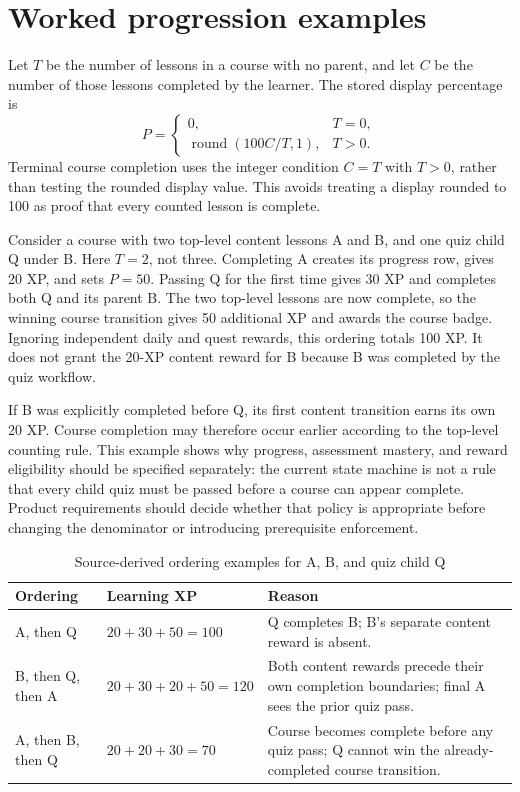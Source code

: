 \documentclass[12pt,a4paper,oneside]{report}
\begin{document}
\section{Worked progression examples}
\label{sec:progression-examples}
Let $T$ be the number of lessons in a course with no parent, and let $C$ be the number
of those lessons completed by the learner. The stored display percentage is
\[
 P = \begin{cases}
  0, & T=0,\\
  \operatorname{round}(100C/T,1), & T>0.
 \end{cases}
\]
Terminal course completion uses the integer condition $C=T$ with $T>0$, rather than
testing the rounded display value. This avoids treating a display rounded to 100 as
proof that every counted lesson is complete.

Consider a course with two top-level content lessons A and B, and one quiz child Q
under B. Here $T=2$, not three. Completing A creates its progress row, gives 20 XP,
and sets $P=50$. Passing Q for the first time gives 30 XP and completes both Q and
its parent B. The two top-level lessons are now complete, so the winning course
transition gives 50 additional XP and awards the course badge. Ignoring independent
daily and quest rewards, this ordering totals 100 XP. It does not grant the 20-XP
content reward for B because B was completed by the quiz workflow.

If B was explicitly completed before Q, its first content transition earns its own
20 XP. Course completion may therefore occur earlier according to the top-level
counting rule. This example shows why progress, assessment mastery, and reward
eligibility should be specified separately: the current state machine is not a rule
that every child quiz must be passed before a course can appear complete. Product
requirements should decide whether that policy is appropriate before changing the
denominator or introducing prerequisite enforcement.

\begin{table}[H]\centering
\caption{Source-derived ordering examples for A, B, and quiz child Q}\label{tab:ordering-example}
\begin{tabular}{P{0.24\textwidth}P{0.24\textwidth}P{0.41\textwidth}}\toprule
\textbf{Ordering} & \textbf{Learning XP} & \textbf{Reason}\\\midrule
A, then Q & $20+30+50=100$ & Q completes B; B's separate content reward is absent.\\
B, then Q, then A & $20+30+20+50=120$ & Both content rewards precede their own completion boundaries; final A sees the prior quiz pass.\\
A, then B, then Q & $20+20+30=70$ & Course becomes complete before any quiz pass; Q cannot win the already-completed course transition.\\
\bottomrule\end{tabular}
\end{table}
\end{document}
